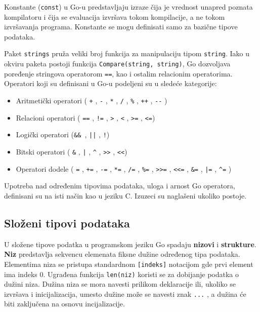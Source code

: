\documentclass[12pt,oneside]{memoir}
\begin{document}
Konstante (\texttt{const}) u Go-u predstavljaju izraze čija je vrednost unapred poznata kompilatoru i čija se evaluacija izvršava tokom kompilacije, a ne tokom izvršavanja programa. Konstante se mogu definisati samo za bazične tipove podataka. 

Paket \texttt{strings} pruža veliki broj funkcija za manipulaciju tipom \texttt{string}. Iako u okviru paketa postoji funkcija \texttt{Compare(string, string)}, Go dozvoljava poređenje stringova operatorom \texttt{==}, kao i ostalim relacionim operatorima.
\\

Operatori koji su definisani u Go-u podeljeni su u sledeće kategorije:
\begin{itemize}

\item Aritmetički operatori ( \texttt{+} ,  \texttt{-} , \texttt{*} ,  \texttt{/} ,  \texttt{\%} ,  \texttt{++} ,   \texttt{-{}-} )
\item Relacioni operatori ( \texttt{==} ,  \texttt{!=} ,  \texttt{>} ,  \texttt{<} ,  \texttt{>=} ,  \texttt{<=})
\item Logički operatori (\texttt{\&\& },  \texttt{||} ,  \texttt{!})
\item Bitski operatori ( \texttt{\&} ,  \texttt{|} ,  \texttt{\^} ,  \texttt{>{}>} ,  \texttt{<{}<})
\item Operatori dodele ( \texttt{=} ,  \texttt{+=} ,  \texttt{-=} ,  \texttt{*=} ,  \texttt{/=} ,  \texttt{\%=} ,   \texttt{>{}>=} ,  \texttt{<{}<=} ,  \texttt{\&=} ,  \texttt{|=} ,  \texttt{\^{}=} )

\end{itemize}

Upotreba nad određenim tipovima podataka, uloga i arnost Go operatora, definisani su na isti način kao u jeziku C. Izuzeci su naglašeni ukoliko postoje. 

\subsection{Složeni tipovi podataka}
U složene tipove podatka u programskom jeziku Go spadaju \textbf{nizovi} i \textbf{strukture}.
\\

\textbf{Niz} predstavlja sekvencu elemenata fiksne dužine određenog tipa podataka. Elementima niza se pristupa standardnom \texttt{[indeks]} notacijom gde prvi element ima indeks 0. Ugrađena funkcija \texttt{len(niz)} koristi se za dobijanje podatka o dužini niza. Dužina niza se mora navesti prilikom deklaracije ili, ukoliko se izvršava i inicijalizacija, umesto dužine može se navesti znak \texttt{...} , a dužina će biti zaključena na osnovu incijalizacije.
\end{document}
